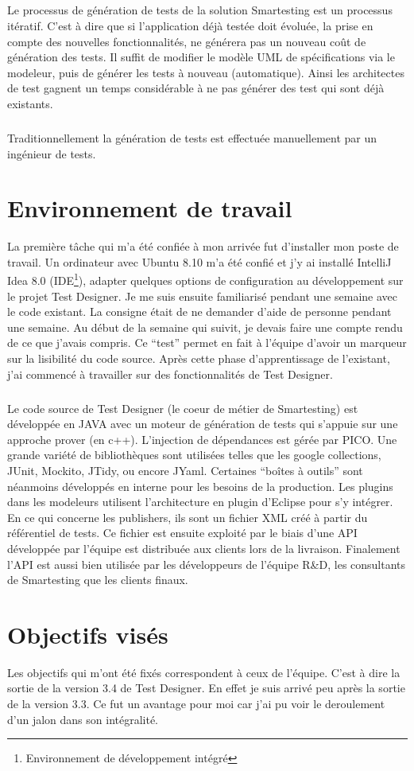 \subparagraph*{}
Le processus de génération de tests de la solution Smartesting est un processus itératif. C'est à dire que si l'application déjà testée doit évoluée, la prise en compte des nouvelles fonctionnalités, ne générera pas un nouveau coût de génération des tests. 
Il suffit de modifier le modèle UML de spécifications via le modeleur, puis de générer les tests à nouveau (automatique). Ainsi les architectes de test gagnent un temps considérable à ne pas générer des test qui sont déjà existants.

\subparagraph*{}
Traditionnellement la génération de tests est effectuée manuellement par un ingénieur de tests.

\section{Environnement de travail}
La première tâche qui m'a été confiée à mon arrivée fut d'installer mon poste de travail. Un ordinateur avec Ubuntu 8.10 m'a été confié et j'y ai installé IntelliJ Idea 8.0 (IDE\footnote{Environnement de développement intégré}), adapter quelques options de configuration au développement sur le projet Test Designer. Je me suis ensuite familiarisé pendant une semaine avec le code existant. La consigne était de ne demander d'aide de personne pendant une semaine. Au début de la semaine qui suivit, je devais faire une compte rendu de ce que j'avais compris. Ce ``test'' permet en fait à l'équipe d'avoir un  marqueur sur la lisibilité du code source. Après cette phase d'apprentissage de l'existant, j'ai commencé à travailler sur des fonctionnalités de Test Designer.

\subparagraph*{}
Le code source de Test Designer (le coeur de métier de Smartesting) est développée en JAVA avec un moteur de génération de tests qui s'appuie sur une approche prover (en c++). L'injection de dépendances est gérée par PICO. Une grande variété de bibliothèques sont utilisées telles que les google collections, JUnit, Mockito, JTidy, ou encore JYaml. Certaines ``boîtes à outils'' sont néanmoins développés en interne pour les besoins de la production. Les plugins dans les modeleurs utilisent l'architecture en plugin d'Eclipse pour s'y intégrer. En ce qui concerne les publishers, ils sont un fichier XML créé à partir du référentiel de tests. Ce fichier est ensuite exploité par le biais d'une API développée par l'équipe est distribuée aux clients lors de la livraison. Finalement l'API est aussi bien utilisée par les développeurs de l'équipe R\&D, les consultants de Smartesting que les clients finaux.

\section{Objectifs visés}
Les objectifs qui m'ont été fixés correspondent à ceux de l'équipe. C'est à dire la sortie de la version 3.4 de Test Designer. En effet je suis arrivé peu après la sortie de la version 3.3. Ce fut un avantage pour moi car j'ai pu voir le deroulement d'un jalon dans son intégralité.